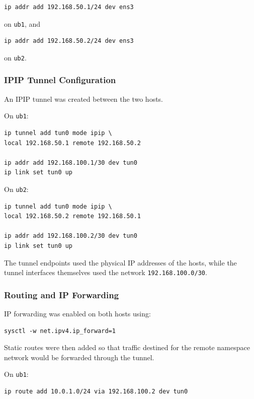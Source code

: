 \documentclass[12pt]{article}
\begin{document}
\begin{verbatim}
ip addr add 192.168.50.1/24 dev ens3
\end{verbatim}

on \texttt{ub1}, and

\begin{verbatim}
ip addr add 192.168.50.2/24 dev ens3
\end{verbatim}

on \texttt{ub2}.

\subsubsection{IPIP Tunnel Configuration}

An IPIP tunnel was created between the two hosts.

On \texttt{ub1}:

\begin{verbatim}
ip tunnel add tun0 mode ipip \
local 192.168.50.1 remote 192.168.50.2

ip addr add 192.168.100.1/30 dev tun0
ip link set tun0 up
\end{verbatim}

On \texttt{ub2}:

\begin{verbatim}
ip tunnel add tun0 mode ipip \
local 192.168.50.2 remote 192.168.50.1

ip addr add 192.168.100.2/30 dev tun0
ip link set tun0 up
\end{verbatim}

The tunnel endpoints used the physical IP addresses of the hosts, while the tunnel interfaces themselves used the network \texttt{192.168.100.0/30}.

\subsubsection{Routing and IP Forwarding}

IP forwarding was enabled on both hosts using:

\begin{verbatim}
sysctl -w net.ipv4.ip_forward=1
\end{verbatim}

Static routes were then added so that traffic destined for the remote namespace network would be forwarded through the tunnel.

On \texttt{ub1}:

\begin{verbatim}
ip route add 10.0.1.0/24 via 192.168.100.2 dev tun0
\end{verbatim}
\end{document}
